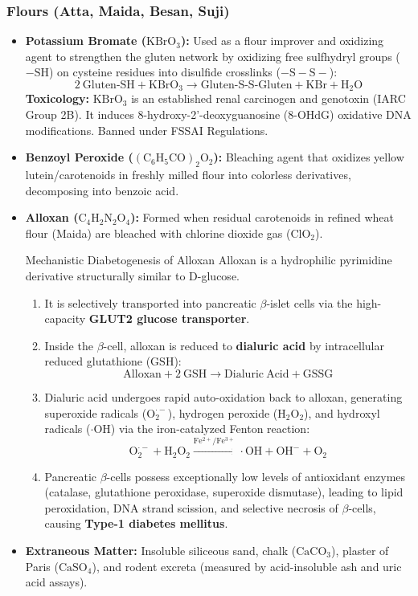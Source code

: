 \documentclass[11pt,a4paper,oneside]{article}
\begin{document}
\subsubsection{Flours (Atta, Maida, Besan, Suji)}
\begin{itemize}[leftmargin=*]
    \item \textbf{Potassium Bromate ($\mathrm{KBrO_3}$):} Used as a flour improver and oxidizing agent to strengthen the gluten network by oxidizing free sulfhydryl groups ($-\mathrm{SH}$) on cysteine residues into disulfide crosslinks ($-\mathrm{S-S-}$):
    $$2\ \text{Gluten-SH} + \mathrm{KBrO_3 \longrightarrow \text{Gluten-S-S-Gluten} + KBr + H_2O}$$
    \textbf{Toxicology:} $\mathrm{KBrO_3}$ is an established renal carcinogen and genotoxin (IARC Group 2B). It induces 8-hydroxy-2'-deoxyguanosine ($8\text{-OHdG}$) oxidative DNA modifications. Banned under FSSAI Regulations.
    \item \textbf{Benzoyl Peroxide ($\mathrm{(C_6H_5CO)_2O_2}$):} Bleaching agent that oxidizes yellow lutein/carotenoids in freshly milled flour into colorless derivatives, decomposing into benzoic acid.
    \item \textbf{Alloxan ($\mathrm{C_4H_2N_2O_4}$):} Formed when residual carotenoids in refined wheat flour (Maida) are bleached with chlorine dioxide gas ($\mathrm{ClO_2}$).
    \begin{hazardbox}{Mechanistic Diabetogenesis of Alloxan}
    Alloxan is a hydrophilic pyrimidine derivative structurally similar to D-glucose.
    \begin{enumerate}
        \item It is selectively transported into pancreatic $\beta$-islet cells via the high-capacity \textbf{GLUT2 glucose transporter}.
        \item Inside the $\beta$-cell, alloxan is reduced to \textbf{dialuric acid} by intracellular reduced glutathione ($\mathrm{GSH}$):
        $$\mathrm{Alloxan + 2\ GSH \longrightarrow Dialuric\ Acid + GSSG}$$
        \item Dialuric acid undergoes rapid auto-oxidation back to alloxan, generating superoxide radicals ($\mathrm{O_2^{\cdot-}}$), hydrogen peroxide ($\mathrm{H_2O_2}$), and hydroxyl radicals ($\mathrm{\cdot OH}$) via the iron-catalyzed Fenton reaction:
        $$\mathrm{O_2^{\cdot-} + H_2O_2 \xrightarrow{Fe^{2+}/Fe^{3+}} \cdot OH + OH^- + O_2}$$
        \item Pancreatic $\beta$-cells possess exceptionally low levels of antioxidant enzymes (catalase, glutathione peroxidase, superoxide dismutase), leading to lipid peroxidation, DNA strand scission, and selective necrosis of $\beta$-cells, causing \textbf{Type-1 diabetes mellitus}.
    \end{enumerate}
    \end{hazardbox}
    \item \textbf{Extraneous Matter:} Insoluble siliceous sand, chalk ($\mathrm{CaCO_3}$), plaster of Paris ($\mathrm{CaSO_4}$), and rodent excreta (measured by acid-insoluble ash and uric acid assays).
\end{itemize}
\end{document}
